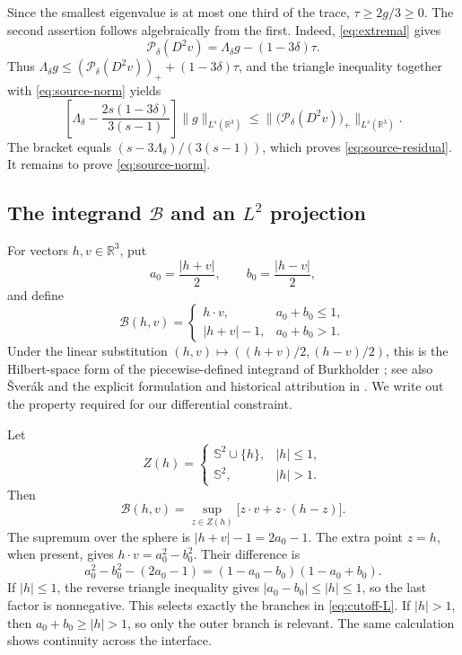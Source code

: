 \documentclass[11pt,a4paper,reqno]{amsart}
\theoremstyle{plain}
\theoremstyle{remark}
\numberwithin{equation}{section}
\newcommand{\R}{\mathbb R}
\newcommand{\Pdelta}{\mathcal P_\delta}
\newcommand{\lam}{\Lambda_\delta}
\newcommand{\norm}[1]{\lVert#1\rVert}
\begin{document}
Since the smallest eigenvalue is at most one third of the trace, $\tau\ge2g/3\ge0$. The second assertion follows algebraically from the first. Indeed, \eqref{eq:extremal} gives
\begin{equation}\label{eq:residual-algebra}
 \Pdelta(D^2v)=\lam g-(1-3\delta)\tau.
\end{equation}
Thus $\lam g\le(\Pdelta(D^2v))_++(1-3\delta)\tau$, and the triangle inequality together with \eqref{eq:source-norm} yields
\[
 \left[\lam-\frac{2s(1-3\delta)}{3(s-1)}\right]
       \norm{g}_{L^s(\R^3)}
 \le\norm{\bigl(\Pdelta(D^2v)\bigr)_+}_{L^s(\R^3)}.
\]
The bracket equals $(s-3\lam)/(3(s-1))$, which proves \eqref{eq:source-residual}. It remains to prove \eqref{eq:source-norm}.

\subsection{The integrand \texorpdfstring{$\mathcal B$}{B} and an \texorpdfstring{$L^2$}{L2} projection}
For vectors $h,v\in\R^3$, put
\[
 a_0=\frac{|h+v|}{2},\qquad b_0=\frac{|h-v|}{2},
\]
and define
\begin{equation}\label{eq:cutoff-L}
 \mathcal B(h,v)=
 \begin{cases}
  h\cdot v,&a_0+b_0\le1,\\
  |h+v|-1,&a_0+b_0>1.
 \end{cases}
\end{equation}
Under the linear substitution $(h,v)\mapsto((h+v)/2,(h-v)/2)$, this is the Hilbert-space form of the piecewise-defined integrand of Burkholder \cite{Burkholder1989}; see also \v{S}ver\'ak \cite{Sverak1990} and the explicit formulation and historical attribution in \cite[Section~1]{BaernsteinMS1999}. We write out the property required for our differential constraint.

Let
\[
 Z(h)=
 \begin{cases}
  \mathbb S^2\cup\{h\},&|h|\le1,\\
  \mathbb S^2,&|h|>1.
 \end{cases}
\]
Then
\begin{equation}\label{eq:support-formula}
 \mathcal B(h,v)=\sup_{z\in Z(h)}\bigl[z\cdot v+z\cdot(h-z)\bigr].
\end{equation}
The supremum over the sphere is $|h+v|-1=2a_0-1$. The extra point $z=h$, when present, gives $h\cdot v=a_0^2-b_0^2$. Their difference is
\[
 a_0^2-b_0^2-(2a_0-1)=(1-a_0-b_0)(1-a_0+b_0).
\]
If $|h|\le1$, the reverse triangle inequality gives $|a_0-b_0|\le|h|\le1$, so the last factor is nonnegative. This selects exactly the branches in \eqref{eq:cutoff-L}. If $|h|>1$, then $a_0+b_0\ge|h|>1$, so only the outer branch is relevant. The same calculation shows continuity across the interface.
\end{document}
